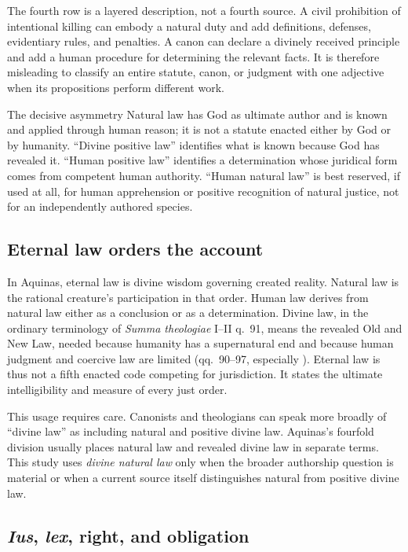 The fourth row is a layered description, not a fourth source. A civil prohibition of intentional killing can embody a natural duty and add definitions, defenses, evidentiary rules, and penalties. A canon can declare a divinely received principle and add a human procedure for determining the relevant facts. It is therefore misleading to classify an entire statute, canon, or judgment with one adjective when its propositions perform different work.

\begin{studybox}{The decisive asymmetry}
Natural law has God as ultimate author and is known and applied through human reason; it is not a statute enacted either by God or by humanity. ``Divine positive law'' identifies what is known because God has revealed it. ``Human positive law'' identifies a determination whose juridical form comes from competent human authority. ``Human natural law'' is best reserved, if used at all, for human apprehension or positive recognition of natural justice, not for an independently authored species.
\end{studybox}

\subsection{Eternal law orders the account}

In Aquinas, eternal law is divine wisdom governing created reality. Natural law is the rational creature's participation in that order. Human law derives from natural law either as a conclusion or as a determination. Divine law, in the ordinary terminology of \emph{Summa theologiae} I--II q.~91, means the revealed Old and New Law, needed because humanity has a supernatural end and because human judgment and coercive law are limited (qq.~90--97, especially ). Eternal law is thus not a fifth enacted code competing for jurisdiction. It states the ultimate intelligibility and measure of every just order.

This usage requires care. Canonists and theologians can speak more broadly of ``divine law'' as including natural and positive divine law. Aquinas's fourfold division usually places natural law and revealed divine law in separate terms. This study uses \emph{divine natural law} only when the broader authorship question is material or when a current source itself distinguishes natural from positive divine law.

\subsection{\emph{Ius}, \emph{lex}, right, and obligation}

